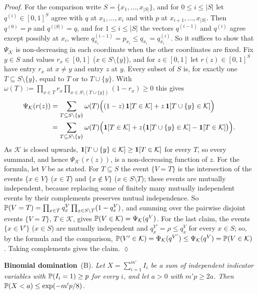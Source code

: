 \emph{Proof.} For the comparison write $S=\{x_1,\dots,x_{|S|}\}$, and for $0\le i\le|S|$ let $q^{(i)}\in[0,1]^S$ agree
with $q$ at $x_1,\dots,x_i$ and with $p$ at $x_{i+1},\dots,x_{|S|}$. Then $q^{(0)}=p$ and $q^{(|S|)}=q$, and for $1\le i\le|S|$
the vectors $q^{(i-1)}$ and $q^{(i)}$ agree except possibly at $x_i$, where
$q^{(i-1)}_{x_i}=p_{x_i}\le q_{x_i}=q^{(i)}_{x_i}$. So it suffices to show that $\Psi_{\mathcal K}$ is non-decreasing
in each coordinate when the other coordinates are fixed. Fix $y\in S$ and values $r_x\in[0,1]$
($x\in S\setminus\{y\}$), and for $z\in[0,1]$ let $r(z)\in[0,1]^S$ have entry $r_x$ at $x\ne y$ and entry $z$ at $y$.
Every subset of $S$ is, for exactly one $T\subseteq S\setminus\{y\}$, equal to $T$ or to $T\cup\{y\}$. With
$\omega(T):=\prod_{x\in T}r_x\prod_{x\in S\setminus(T\cup\{y\})}(1-r_x)\ge0$ this gives
\begin{align*}
\Psi_{\mathcal K}(r(z))&=\sum_{T\subseteq S\setminus\{y\}}\omega(T)\Bigl((1-z)\,\mathbf{1}[T\in\mathcal K]+z\,\mathbf{1}[T\cup\{y\}\in\mathcal K]\Bigr)\\
&=\sum_{T\subseteq S\setminus\{y\}}\omega(T)\Bigl(\mathbf{1}[T\in\mathcal K]+z\bigl(\mathbf{1}[T\cup\{y\}\in\mathcal K]-\mathbf{1}[T\in\mathcal K]\bigr)\Bigr).
\end{align*}
As $\mathcal K$ is closed upwards, $\mathbf{1}[T\cup\{y\}\in\mathcal K]\ge\mathbf{1}[T\in\mathcal K]$ for every $T$, so every
summand, and hence $\Psi_{\mathcal K}(r(z))$, is a non-decreasing function of $z$. For the formula, let $V$ be as
stated. For $T\subseteq S$ the event $\{V=T\}$ is the intersection of the events $\{x\in V\}$ ($x\in T$) and
$\{x\notin V\}$ ($x\in S\setminus T$); these events are mutually independent, because replacing some of finitely many
mutually independent events by their complements preserves mutual independence. So
$\mathbb{P}(V=T)=\prod_{x\in T}q^V_x\prod_{x\in S\setminus T}(1-q^V_x)$, and summing over the pairwise disjoint events
$\{V=T\}$, $T\in\mathcal K$, gives $\mathbb{P}(V\in\mathcal K)=\Psi_{\mathcal K}(q^V)$. For the last claim, the events
$\{x\in V'\}$ \textup{(}$x\in S$\textup{)} are mutually independent and $q^{V'}_x=\rho\le q^V_x$ for every $x\in S$; so,
by the formula and the comparison,
$\mathbb{P}(V'\in\mathcal K)=\Psi_{\mathcal K}(q^{V'})\le\Psi_{\mathcal K}(q^V)=\mathbb{P}(V\in\mathcal K)$. Taking complements
gives the claim. \hfill$\lozenge$

\smallskip\noindent\textbf{Binomial domination}~\textup{(B)}.
\emph{Let $X=\sum_{i=1}^{m'}I_i$ be a sum of independent indicator variables with $\mathbb{P}(I_i=1)\ge p$ for every $i$,
and let $a>0$ with $m'p\ge2a$. Then $\mathbb{P}(X<a)\le\exp(-m'p/8)$.}

